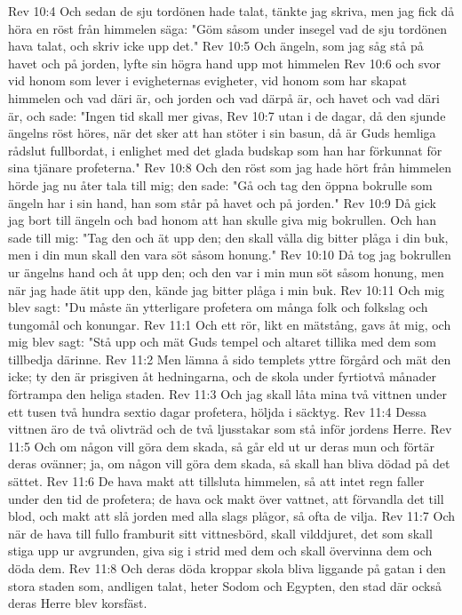 Rev 10:4  Och sedan de sju tordönen hade talat, tänkte jag skriva, men jag fick då höra en röst från himmelen säga: "Göm såsom under insegel vad de sju tordönen hava talat, och skriv icke upp det."
Rev 10:5  Och ängeln, som jag såg stå på havet och på jorden, lyfte sin högra hand upp mot himmelen
Rev 10:6  och svor vid honom som lever i evigheternas evigheter, vid honom som har skapat himmelen och vad däri är, och jorden och vad därpå är, och havet och vad däri är, och sade: "Ingen tid skall mer givas,
Rev 10:7  utan i de dagar, då den sjunde ängelns röst höres, när det sker att han stöter i sin basun, då är Guds hemliga rådslut fullbordat, i enlighet med det glada budskap som han har förkunnat för sina tjänare profeterna."
Rev 10:8  Och den röst som jag hade hört från himmelen hörde jag nu åter tala till mig; den sade: "Gå och tag den öppna bokrulle som ängeln har i sin hand, han som står på havet och på jorden."
Rev 10:9  Då gick jag bort till ängeln och bad honom att han skulle giva mig bokrullen. Och han sade till mig: "Tag den och ät upp den; den skall vålla dig bitter plåga i din buk, men i din mun skall den vara söt såsom honung."
Rev 10:10  Då tog jag bokrullen ur ängelns hand och åt upp den; och den var i min mun söt såsom honung, men när jag hade ätit upp den, kände jag bitter plåga i min buk.
Rev 10:11  Och mig blev sagt: "Du måste än ytterligare profetera om många folk och folkslag och tungomål och konungar.
Rev 11:1  Och ett rör, likt en mätstång, gavs åt mig, och mig blev sagt: "Stå upp och mät Guds tempel och altaret tillika med dem som tillbedja därinne.
Rev 11:2  Men lämna å sido templets yttre förgård och mät den icke; ty den är prisgiven åt hedningarna, och de skola under fyrtiotvå månader förtrampa den heliga staden.
Rev 11:3  Och jag skall låta mina två vittnen under ett tusen två hundra sextio dagar profetera, höljda i säcktyg.
Rev 11:4  Dessa vittnen äro de två olivträd och de två ljusstakar som stå inför jordens Herre.
Rev 11:5  Och om någon vill göra dem skada, så går eld ut ur deras mun och förtär deras ovänner; ja, om någon vill göra dem skada, så skall han bliva dödad på det sättet.
Rev 11:6  De hava makt att tillsluta himmelen, så att intet regn faller under den tid de profetera; de hava ock makt över vattnet, att förvandla det till blod, och makt att slå jorden med alla slags plågor, så ofta de vilja.
Rev 11:7  Och när de hava till fullo framburit sitt vittnesbörd, skall vilddjuret, det som skall stiga upp ur avgrunden, giva sig i strid med dem och skall övervinna dem och döda dem.
Rev 11:8  Och deras döda kroppar skola bliva liggande på gatan i den stora staden som, andligen talat, heter Sodom och Egypten, den stad där också deras Herre blev korsfäst.
